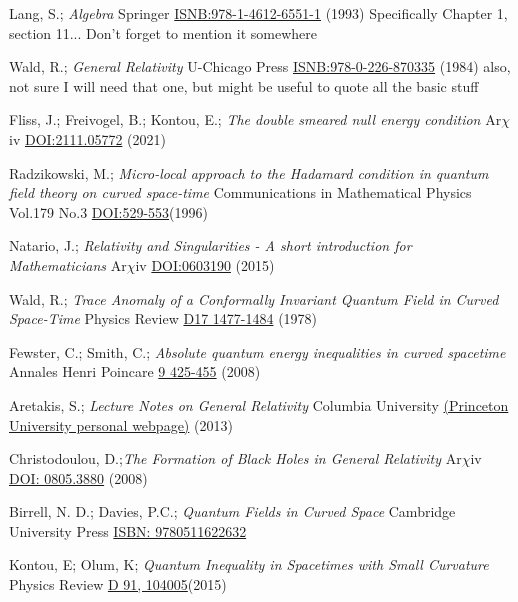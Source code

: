 \documentclass[a4paper,11pt]{article}
\numberwithin{equation}{section}
\theoremstyle{definition}
\begin{document}
\begin{thebibliography}{99}
    Lang, S.; \textit{Algebra} Springer \href{https://link.springer.com/book/10.1007/978-1-4613-0041-0}{ISNB:978-1-4612-6551-1} (1993) \color{red} Specifically Chapter 1, section 11... Don't forget to mention it somewhere\color{black}

    Wald, R.; \textit{General Relativity} U-Chicago Press \href{https://press.uchicago.edu/ucp/books/book/chicago/G/bo5952261.html}{ISNB:978-0-226-870335} (1984) \color{red}also, not sure I will need that one, but might be useful to quote all the basic stuff\color{black}

    Fliss, J.; Freivogel, B.; Kontou, E.; \textit{The double smeared null energy condition} Ar$\chi$iv \href{https://arxiv.org/abs/2111.05772#}{DOI:2111.05772} (2021)

    Radzikowski, M.; \textit{Micro-local approach to the Hadamard condition in quantum field theory on curved space-time} Communications in Mathematical Physics Vol.179 No.3 \href{https://projecteuclid.org/journals/communications-in-mathematical-physics/volume-179/issue-3/Micro-local-approach-to-the-Hadamard-condition-in-quantum-field/cmp/1104287114.full}{DOI:529-553}(1996)

    Natario, J.; \textit{Relativity and Singularities - A short introduction for Mathematicians} Ar$\chi$iv \href{https://arxiv.org/abs/math/0603190}{DOI:0603190} (2015)

    Wald, R.; \textit{Trace Anomaly of a Conformally Invariant Quantum Field in Curved Space-Time} Physics Review \href{https://journals.aps.org/prd/abstract/10.1103/PhysRevD.17.1477}{D17 1477-1484} (1978)

    Fewster, C.; Smith, C.; \textit{Absolute quantum energy inequalities in curved spacetime} Annales Henri Poincare \href{https://arxiv.org/abs/gr-qc/0702056}{9 425-455} (2008)

    Aretakis, S.; \textit{Lecture Notes on General Relativity} Columbia University \href{https://web.math.princeton.edu/~aretakis/columbiaGR.pdf}{(Princeton University personal webpage)} (2013)

    Christodoulou, D.;\textit{The Formation of Black Holes in General Relativity} Ar$\chi$iv \href{http://arxiv.org/abs/0805.3880v1#}{DOI: 0805.3880} (2008)

    Birrell, N. D.; Davies, P.C.; \textit{Quantum Fields in Curved Space} Cambridge University Press \href{https://www.cambridge.org/core/books/quantum-fields-in-curved-space/95376B0CAD78EE767FCD6205F8327F4C#}{ISBN: 9780511622632}

    Kontou, E; Olum, K; \textit{Quantum Inequality in Spacetimes with Small Curvature} Physics Review \href{https://journals.aps.org/prd/abstract/10.1103/PhysRevD.91.104005}{D 91,  104005}(2015)
\end{thebibliography} 
\end{document}
